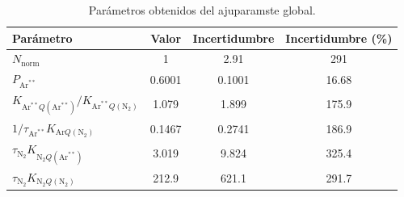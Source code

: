 \begin{table}[htbp]
\centering
\caption{Parámetros obtenidos del ajuparamste global.}
\label{tab:fit_params}
\begin{tabular}{lccc}
\toprule
Parámetro & Valor & Incertidumbre & Incertidumbre (\%) \\
\midrule
$N_{\text{norm}}$ & \num{1} & \num{2.91} & \num{291} \\
$P_{\mathrm{Ar}^{**}} $ & \num{0.6001} & \num{0.1001} & \num{16.68} \\
$K_{\mathrm{Ar}^{**}Q(\mathrm{Ar}^{**})}/K_{\mathrm{Ar}^{**}Q(\mathrm{N}_2)} $ & \num{1.079} & \num{1.899} & \num{175.9} \\
$1 / {\tau_{\mathrm{Ar}^{**}} K_{\mathrm{Ar}Q(\mathrm{N}_2)}} $ & \num{0.1467} & \num{0.2741} & \num{186.9} \\
${\tau_{\mathrm{N}_2} K_{\mathrm{N}_2Q(\mathrm{Ar}^{**})}}$ & \num{3.019} & \num{9.824} & \num{325.4} \\
${\tau_{\mathrm{N}_2} K_{\mathrm{N}_2Q(\mathrm{N}_2)}}$ & \num{212.9} & \num{621.1} & \num{291.7} \\
\bottomrule
\end{tabular}
\end{table}
